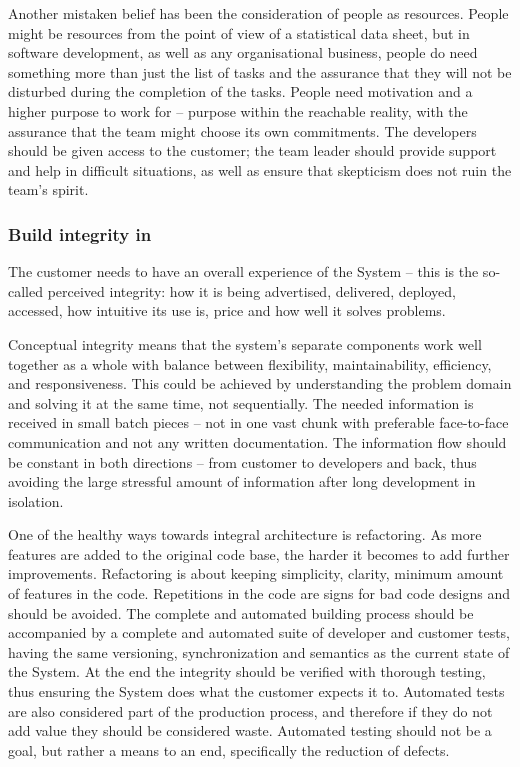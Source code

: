 Another mistaken belief has been the consideration of people as resources. People might be resources from the point of view of a statistical data sheet, but in software development, as well as any organisational business, people do need something more than just the list of tasks and the assurance that they will not be disturbed during the completion of the tasks. People need motivation and a higher purpose to work for -- purpose within the reachable reality, with the assurance that the team might choose its own commitments. The developers should be given access to the customer; the team leader should provide support and help in difficult situations, as well as ensure that skepticism does not ruin the team’s spirit.

\subsubsection{Build integrity in}

The customer needs to have an overall experience of the System -- this is the so-called perceived integrity: how it is being advertised, delivered, deployed, accessed, how intuitive its use is, price and how well it solves problems.

Conceptual integrity means that the system’s separate components work well together as a whole with balance between flexibility, maintainability, efficiency, and responsiveness. This could be achieved by understanding the problem domain and solving it at the same time, not sequentially. The needed information is received in small batch pieces -- not in one vast chunk with preferable face-to-face communication and not any written documentation. The information flow should be constant in both directions -- from customer to developers and back, thus avoiding the large stressful amount of information after long development in isolation.

One of the healthy ways towards integral architecture is refactoring. As more features are added to the original code base, the harder it becomes to add further improvements. Refactoring is about keeping simplicity, clarity, minimum amount of features in the code. Repetitions in the code are signs for bad code designs and should be avoided. The complete and automated building process should be accompanied by a complete and automated suite of developer and customer tests, having the same versioning, synchronization and semantics as the current state of the System. At the end the integrity should be verified with thorough testing, thus ensuring the System does what the customer expects it to. Automated tests are also considered part of the production process, and therefore if they do not add value they should be considered waste. Automated testing should not be a goal, but rather a means to an end, specifically the reduction of defects.

